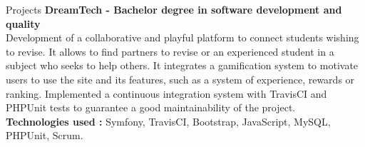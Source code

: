 \documentclass[
	10pt, %
]{resume}
\begin{document}
\begin{rSection}{Projects}
	{\bf DreamTech - Bachelor degree in software development and quality}
	\\ Development of a collaborative and playful platform to connect students wishing to revise. 
	It allows to find partners to revise or an experienced student in a subject who seeks to help others. 
	It integrates a gamification system to motivate users to use the site and its features, such as a system of experience, rewards or ranking. 
	Implemented a continuous integration system with TravisCI and PHPUnit tests to guarantee a good maintainability of the project.
	\\ \textbf{Technologies used :} Symfony, TravisCI, Bootstrap, JavaScript, MySQL, PHPUnit, Scrum.


\end{rSection}
\end{document}
